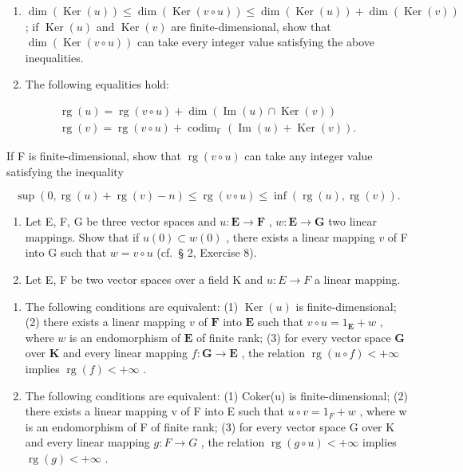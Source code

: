\begin{enumerate}
\def\labelenumi{(\alph{enumi})}
\setcounter{enumi}{1}
\item
  \(\dim(\operatorname{Ker}(u)) \leqslant \dim(\operatorname{Ker}(v \circ u)) \leqslant \dim(\operatorname{Ker}(u)) + \dim(\operatorname{Ker}(v))\) ; if \(\operatorname{Ker}(u)\) and \(\operatorname{Ker}(v)\) are finite-dimensional, show that \(\dim(\operatorname{Ker}(v \circ u))\) can take every integer value satisfying the above inequalities.
\item
  The following equalities hold:
\end{enumerate}

\[
\begin{array}{l} \operatorname{rg} (u) = \operatorname{rg} (v \circ u) + \dim (\operatorname{Im} (u) \cap \operatorname{Ker} (v)) \\ \operatorname{rg} (v) = \operatorname{rg} (v \circ u) + \operatorname{codim} _ {\mathbb {F}} (\operatorname{Im} (u) + \operatorname{Ker} (v)). \end{array}
\]

If F is finite-dimensional, show that \(\operatorname{rg}(v \circ u)\) can take any integer value satisfying the inequality

\[
\sup (0, \operatorname{rg} (u) + \operatorname{rg} (v) - n) \leqslant \operatorname{rg} (v \circ u) \leqslant \inf (\operatorname{rg} (u), \operatorname{rg} (v)).
\]

\begin{enumerate}
\def\labelenumi{\arabic{enumi}.}
\setcounter{enumi}{13}
\item
  Let E, F, G be three vector spaces and \(u: \mathbf{E} \to \mathbf{F}\) , \(w: \mathbf{E} \to \mathbf{G}\) two linear mappings. Show that if \(u(0) \subset w(0)\) , there exists a linear mapping \(v\) of F into G such that \(w = v \circ u\) (cf.~§ 2, Exercise 8).
\item
  Let E, F be two vector spaces over a field K and \(u: E \rightarrow F\) a linear mapping.
\end{enumerate}

\begin{enumerate}
\def\labelenumi{(\alph{enumi})}
\item
  The following conditions are equivalent: (1) \(\operatorname{Ker}(u)\) is finite-dimensional; (2) there exists a linear mapping \(v\) of \(\mathbf{F}\) into \(\mathbf{E}\) such that \(v \circ u = 1_{\mathbf{E}} + w\) , where \(w\) is an endomorphism of \(\mathbf{E}\) of finite rank; (3) for every vector space \(\mathbf{G}\) over \(\mathbf{K}\) and every linear mapping \(f: \mathbf{G} \to \mathbf{E}\) , the relation \(\operatorname{rg}(u \circ f) < +\infty\) implies \(\operatorname{rg}(f) < +\infty\) .
\item
  The following conditions are equivalent: (1) Coker(u) is finite-dimensional; (2) there exists a linear mapping v of F into E such that \(u \circ v = 1_{F} + w\) , where w is an endomorphism of F of finite rank; (3) for every vector space G over K and every linear mapping \(g: F \to G\) , the relation \(\operatorname{rg}(g \circ u) < +\infty\) implies \(\operatorname{rg}(g) < +\infty\) .
\end{enumerate}

